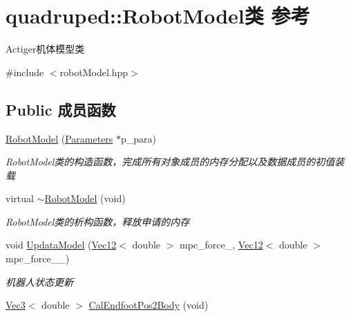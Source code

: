 \hypertarget{classquadruped_1_1RobotModel}{}\section{quadruped\+:\+:Robot\+Model类 参考}
\label{classquadruped_1_1RobotModel}


Actiger机体模型类  




{\ttfamily \#include $<$robot\+Model.\+hpp$>$}

\subsection*{Public 成员函数}
\begin{DoxyCompactItemize}
\item 
\hyperlink{classquadruped_1_1RobotModel_a2b085b7aa05e3eee3762ce41f7071c49}{Robot\+Model} (\hyperlink{classquadruped_1_1Parameters}{Parameters} $\ast$p\+\_\+para)
\begin{DoxyCompactList}\small\item\em Robot\+Model类的构造函数，完成所有对象成员的内存分配以及数据成员的初值装载 \end{DoxyCompactList}\item 
\mbox{\label{classquadruped_1_1RobotModel_a68f7cca4a9a25d8613d729b102ad98ac}} 
virtual \hyperlink{classquadruped_1_1RobotModel_a68f7cca4a9a25d8613d729b102ad98ac}{$\sim$\+Robot\+Model} (void)
\begin{DoxyCompactList}\small\item\em Robot\+Model类的析构函数，释放申请的内存 \end{DoxyCompactList}\item 
void \hyperlink{classquadruped_1_1RobotModel_ab9102ec0f630d1623764b383784669c4}{Updata\+Model} (\hyperlink{cppTypes_8h_a87f228860242acc66da2e58086d18cec}{Vec12}$<$ double $>$ mpc\+\_\+force\+\_\+, \hyperlink{cppTypes_8h_a87f228860242acc66da2e58086d18cec}{Vec12}$<$ double $>$ mpc\+\_\+force\+\_\+\_\+)
\begin{DoxyCompactList}\small\item\em 机器人状态更新 \end{DoxyCompactList}\item 
\hyperlink{cppTypes_8h_a65c27bf97693676535dd0b30ea0ad399}{Vec3}$<$ double $>$ \hyperlink{classquadruped_1_1RobotModel_ab012ef79f233734f3598493711c8fb4c}{Cal\+Endfoot\+Pos2\+Body} (void)

\end{DoxyCompactItemize}
